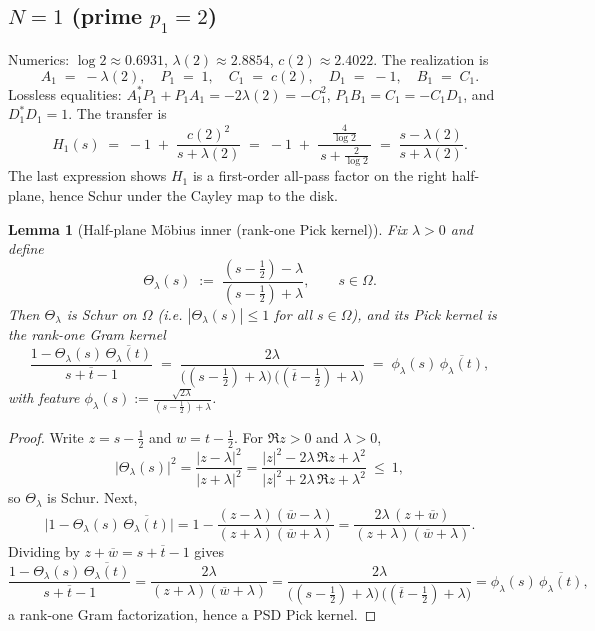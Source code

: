 \documentclass[11pt]{article}
\newtheorem{lemma}[theorem]{Lemma}
\theoremstyle{definition}
\theoremstyle{remark}
\begin{document}
\subsection*{$N=1$ (prime $p_1=2$)}
Numerics: \(\log 2\approx 0.6931\), \(\lambda(2)\approx 2.8854\), \(c(2)\approx 2.4022\). The realization is
\[
 A_1\;=\;-\lambda(2),\quad P_1\;=\;1,\quad C_1\;=\;c(2),\quad D_1\;=\;-1,\quad B_1\;=\;C_1.
\]
Lossless equalities: \(A_1^*P_1+P_1A_1=-2\lambda(2)=-C_1^2\), \(P_1B_1=C_1=-C_1 D_1\), and \(D_1^*D_1=1\). The transfer is
\[
 H_1(s)\;=\;-1\; +\; \frac{c(2)^2}{s+\lambda(2)}\;=\;-1\; +\;\frac{\tfrac{4}{\log 2}}{\,s+\tfrac{2}{\log 2}\,}\;=\;\frac{s-\lambda(2)}{s+\lambda(2)}.
\]
The last expression shows \(H_1\) is a first-order all-pass factor on the right half-plane, hence Schur under the Cayley map to the disk.

\begin{lemma}[Half-plane M\"obius inner (rank-one Pick kernel)]\label{lem:moebius-contract}
Fix \(\lambda>0\) and define
\[
  \Theta_\lambda(s)\;:=\;\frac{(s-\tfrac12)-\lambda}{(s-\tfrac12)+\lambda},\qquad s\in\Omega.
\]
Then \(\Theta_\lambda\) is Schur on \(\Omega\) (i.e. \(|\Theta_\lambda(s)|\le 1\) for all \(s\in\Omega\)), and its Pick kernel is the rank-one Gram kernel
\[
  \frac{1-\Theta_\lambda(s)\,\overline{\Theta_\lambda(t)}}{s+\overline t-1}
  \;=\; \frac{2\lambda}{\big((s-\tfrac12)+\lambda\big)\,\big((\overline t-\tfrac12)+\lambda\big)}
  \;=\; \phi_\lambda(s)\,\overline{\phi_\lambda(t)},
\]
with feature \(\displaystyle \phi_\lambda(s):=\frac{\sqrt{2\lambda}}{(s-\tfrac12)+\lambda}\).
\end{lemma}
\fi %
\begin{proof}
Write \(z=s-\tfrac12\) and \(w=t-\tfrac12\). For \(\Re z>0\) and \(\lambda>0\),
\[
  \bigl|\Theta_\lambda(s)\bigr|^2
  =\frac{|z-\lambda|^2}{|z+\lambda|^2}
  =\frac{|z|^2-2\lambda\,\Re z+\lambda^2}{|z|^2+2\lambda\,\Re z+\lambda^2}\ \le\ 1,
\]
so \(\Theta_\lambda\) is Schur. Next,
\[
  \bigl|1-\Theta_\lambda(s)\,\overline{\Theta_\lambda(t)}\bigr|
  = 1-\frac{(z-\lambda)(\overline w-\lambda)}{(z+\lambda)(\overline w+\lambda)}
  = \frac{2\lambda\,(z+\overline w)}{(z+\lambda)(\overline w+\lambda)}.
\]
Dividing by \(z+\overline w=s+\overline t-1\) gives
\[
  \frac{1-\Theta_\lambda(s)\,\overline{\Theta_\lambda(t)}}{s+\overline t-1}
  = \frac{2\lambda}{(z+\lambda)(\overline w+\lambda)}
  = \frac{2\lambda}{\big((s-\tfrac12)+\lambda\big)\,\big((\overline t-\tfrac12)+\lambda\big)}
  = \phi_\lambda(s)\,\overline{\phi_\lambda(t)},
\]
a rank‑one Gram factorization, hence a PSD Pick kernel.
\end{proof}
\end{document}

